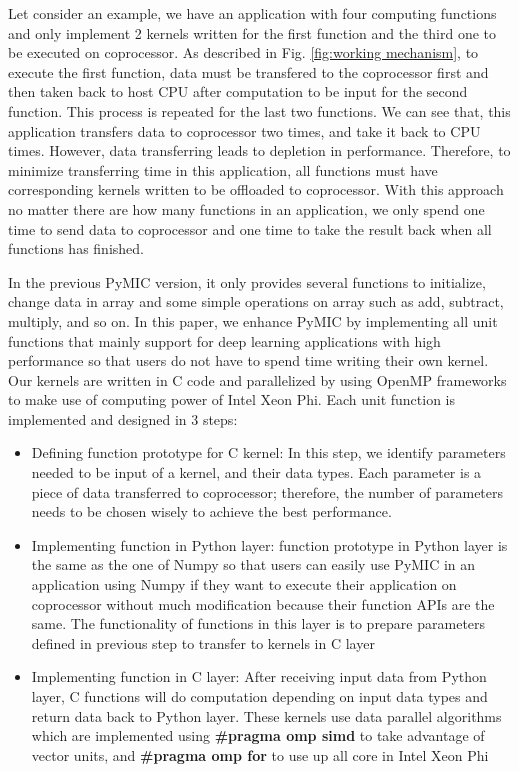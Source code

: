 Let consider an example, we have an application with four computing functions and only implement 2 kernels written for the first function and the third one to be executed on coprocessor. As described in Fig. \ref{fig:working mechanism}, to execute the first function, data must be transfered to the coprocessor first and then taken back to host CPU after computation to be input for the second function. This process is repeated for the last two functions. We can see that, this application transfers data to coprocessor two times, and take it back to CPU times. However, data transferring leads to depletion in performance. Therefore, to minimize transferring time in this application, all functions must have corresponding kernels written to be offloaded to coprocessor. With this approach no matter there are how many functions in an application, we only spend one time to send data to coprocessor and one time to take the result back when all functions has finished. 

In the previous PyMIC version, it only provides several functions to initialize, change data in array and some simple operations on array such as add, subtract, multiply, and so on. In this paper, we enhance PyMIC by implementing all unit functions that mainly support for deep learning applications with high performance so that users do not have to spend time writing their own kernel. Our kernels are written in C code and parallelized by using OpenMP frameworks to make use of computing power of Intel Xeon Phi. Each unit function is implemented and designed in 3 steps:

\begin{itemize}
\item Defining function prototype for C kernel: In this step, we identify parameters needed to be input of a kernel, and their data types. Each parameter is a piece of data transferred to coprocessor; therefore, the number of parameters needs to be chosen wisely to achieve the best performance.

\item Implementing function in Python layer: function prototype in Python layer is the same as the one of Numpy so that users can easily use PyMIC in an application using Numpy if they want to execute their application on coprocessor without much modification because their function APIs are the same. The functionality of functions in this layer is to prepare parameters defined in previous step to transfer to kernels in C layer  		
			
\item Implementing function in C layer: After receiving input data from Python layer, C functions will do computation depending on input data types and return data back to Python layer. These kernels use data parallel algorithms which are implemented using \textbf{\#pragma omp simd} to take advantage of vector units, and \textbf{\#pragma omp for} to use up all core in Intel Xeon Phi
\end{itemize}
